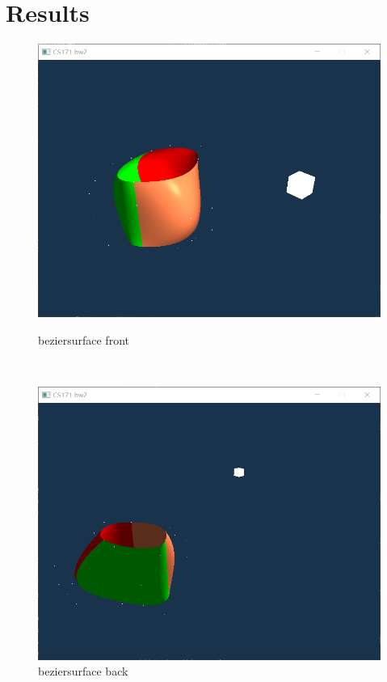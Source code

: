 \documentclass[acmtog]{acmart}
\begin{document}
\section{Results}
\begin{figure}[h]
	\begin{minipage}[b]{.4\linewidth}
		\includegraphics[scale=0.25]{beziersurface.png}
		\caption{beziersurface front}
	\end{minipage}
	\\
	\begin{minipage}[b]{.4\linewidth}
		\includegraphics[scale=0.25]{beziersurface2.png}
		\caption{beziersurface back}

\end{minipage}
\end{figure}
\end{document}
